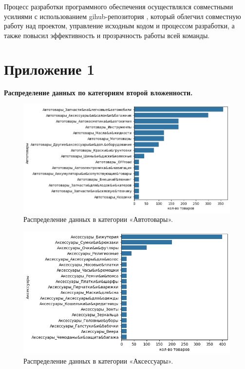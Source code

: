 \documentclass[a4paper,12pt]{extarticle}
\begin{document}
Процесс разработки программного обеспечения осуществлялся совместными усилиями с использованием gihub-репозитория \cite{github}, который облегчил совместную работу над проектом, управление исходным кодом и процессом разработки, а также повысил эффективность и прозрачность работы всей команды.

\newpage
\nocite{*}
\printbibliography[heading=bibintoc]

\newpage
\appendix

\section{Приложение 1}
\label{appendix:amount_of_categor2}
\textbf{\large{Распределение данных по категориям второй вложенности.}}

\begin{figure}[hbtp]
	\centering
	\includegraphics[scale=0.8]{приложения/amount_of_category_Автотовары.png}
	\caption{Распределение данных в категории «Автотовары».}
	\label{fig:amount_of_category_Автотовары}
\end{figure}

\begin{figure}[hbtp]
	\centering
	\includegraphics[scale=0.8]{приложения/amount_of_category_Аксессуары.png}
	\caption{Распределение данных в категории «Аксессуары».}
	\label{fig:amount_of_category_Аксессуары}
\end{figure}
\end{document}
